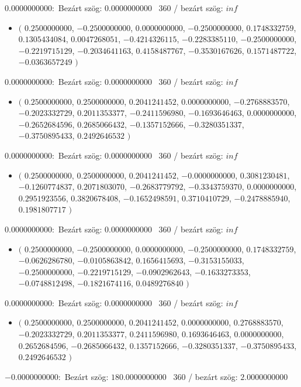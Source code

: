 \documentclass[14pt,a4paper]{article}
\begin{document}
$0.0000000000$:\
Bezárt szög: $0.0000000000$ \
360 / bezárt szög: $inf$\
\begin{itemize}
\item
$\big($
$0.2500000000$, $-0.2500000000$, $0.0000000000$, $-0.2500000000$, $0.1748332759$, $0.1305434084$, $0.0047268051$, $-0.4214326115$, $-0.2283385110$, $-0.2500000000$, $-0.2219715129$, $-0.2034641163$, $0.4158487767$, $-0.3530167626$, $0.1571487722$, $-0.0363657249$
$\big)$
\end{itemize}
$0.0000000000$:\
Bezárt szög: $0.0000000000$ \
360 / bezárt szög: $inf$\
\begin{itemize}
\item
$\big($
$0.2500000000$, $0.2500000000$, $0.2041241452$, $0.0000000000$, $-0.2768883570$, $-0.2023332729$, $0.2011353377$, $-0.2411596980$, $-0.1693646463$, $0.0000000000$, $-0.2652684596$, $0.2685066432$, $-0.1357152666$, $-0.3280351337$, $-0.3750895433$, $0.2492646532$
$\big)$
\end{itemize}
$0.0000000000$:\
Bezárt szög: $0.0000000000$ \
360 / bezárt szög: $inf$\
\begin{itemize}
\item
$\big($
$0.2500000000$, $0.2500000000$, $0.2041241452$, $-0.0000000000$, $0.3081230481$, $-0.1260774837$, $0.2071803070$, $-0.2683779792$, $-0.3343759370$, $0.0000000000$, $0.2951923556$, $0.3820678408$, $-0.1652498591$, $0.3710410729$, $-0.2478885940$, $0.1981807717$
$\big)$
\end{itemize}
$0.0000000000$:\
Bezárt szög: $0.0000000000$ \
360 / bezárt szög: $inf$\
\begin{itemize}
\item
$\big($
$0.2500000000$, $-0.2500000000$, $0.0000000000$, $-0.2500000000$, $0.1748332759$, $-0.0626286780$, $-0.0105863842$, $0.1656415693$, $-0.3153155033$, $-0.2500000000$, $-0.2219715129$, $-0.0902962643$, $-0.1633273353$, $-0.0748812498$, $-0.1821674116$, $0.0489276840$
$\big)$
\end{itemize}
$0.0000000000$:\
Bezárt szög: $0.0000000000$ \
360 / bezárt szög: $inf$\
\begin{itemize}
\item
$\big($
$0.2500000000$, $0.2500000000$, $0.2041241452$, $0.0000000000$, $0.2768883570$, $-0.2023332729$, $0.2011353377$, $0.2411596980$, $0.1693646463$, $0.0000000000$, $0.2652684596$, $-0.2685066432$, $0.1357152666$, $-0.3280351337$, $-0.3750895433$, $0.2492646532$
$\big)$
\end{itemize}
$-0.0000000000$:\
Bezárt szög: $180.0000000000$ \
360 / bezárt szög: $2.0000000000$\
\end{document}
